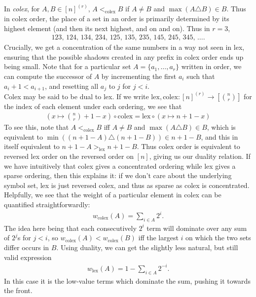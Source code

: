 \documentclass{tikzposter} %
\begin{document}
\begin{columns}
{{    In \emph{colex}, for $A, B \in [n]^{(r)}$, $A <_{\mathrm{colex}} B$ if $A \neq B$ and $\max(A \triangle B) \in B$. Thus in colex order, the place of a set in an order is primarily determined by its highest element (and then its next highest, and on and on). Thus in $r = 3$,
    \begin{align*}
      123,\,124,\,134,\,234,\,125,\,135,\,235,\,145,\,245,\,345,\,\dots.
    \end{align*}
    Crucially, we get a concentration of the same numbers in a way not seen in lex, ensuring that the possible shadows created in any prefix in colex order ends up being small. Note that for a particular set $A = \{a_1, \dots, a_r\}$ written in order, we can compute the successor of $A$ by incrementing the first $a_i$ such that $a_i + 1 < a_{i + 1}$, and resetting all $a_j$ to $j$ for $j < i$. \\

    Colex may be said to be dual to lex. If we write $\mathrm{lex}, \mathrm{colex} : [n]^{(r)} \to [{n \choose r}]$ for the index of each element under each ordering, we see that
    \begin{align*}
      \left(x \mapsto {n \choose r} + 1 - x\right) \circ \mathrm{colex} = \mathrm{lex} \circ (x \mapsto n+1 - x)
    \end{align*}
    To see this, note that $A <_{\mathrm{colex}} B$ iff $A \neq B$ and $\max(A \triangle B) \in B$, which is equivalent to $\min((n+1-A) \triangle (n+1-B)) \in n+1-B$, and this in itself equivalent to $n+1-A >_{\mathrm{lex}} n+1-B$. Thus colex order is equivalent to reversed lex order on the reversed order on $[n]$, giving us our duality relation. If we have intuitively that colex gives a concentrated ordering while lex gives a sparse ordering, then this explains it: if we don't care about the underlying symbol set, lex is just reversed colex, and thus as sparse as colex is concentrated. \\

    Helpfully, we see that the weight of a particular element in colex can be quantified straightforwardly:
    \begin{align*}
      w_{\mathrm{colex}}(A) = \sum_{i \in A} 2^i.
    \end{align*}
    The idea here being that each consecutively $2^i$ term will dominate over any sum of $2^j$s for $j < i$, so $w_{\mathrm{colex}}(A) < w_{\mathrm{colex}}(B)$ iff the largest $i$ on which the two sets differ occurs in $B$. Using duality, we can get the slightly less natural, but still valid expression
    \begin{align*}
      w_{\mathrm{lex}}(A) = 1 - \sum_{i \in A} 2^{-i}.
    \end{align*}
    In this case it is the low-value terms which dominate the sum, pushing it towards the front. \\

}}
\end{columns}
\end{document}
